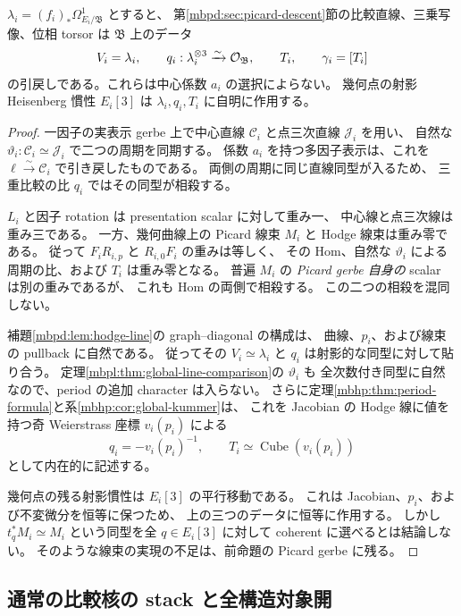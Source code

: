 \begin{lemma}[周期データの射影的自然性]
\label{mbic:lem:phase-descent}
$\lambda_i=(f_i)_*\Omega^1_{E_i/\mathfrak B}$ とすると、
第\ref{mbpd:sec:picard-descent}節の比較直線、三乗写像、位相 torsor は
$\mathfrak B$ 上のデータ
\[
 V_i=\lambda_i,\qquad q_i:\lambda_i^{\otimes3}\xrightarrow{\sim}\mathcal O_{\mathfrak B},
 \qquad T_i,\qquad \gamma_i=[T_i]
\]
の引戻しである。これらは中心係数 $a_i$ の選択によらない。
幾何点の射影 Heisenberg 慣性 $E_i[3]$ は $\lambda_i,q_i,T_i$ に自明に作用する。
\end{lemma}
\begin{proof}
一因子の実表示 gerbe 上で中心直線 $\mathcal C_i$ と点三次直線 $\mathcal J_i$ を用い、
自然な $\vartheta_i:\mathcal C_i\simeq\mathcal J_i$ で二つの周期を同期する。
係数 $a_i$ を持つ多因子表示は、これを
$\ell\xrightarrow{\sim}\mathcal C_i$ で引き戻したものである。
両側の周期に同じ直線同型が入るため、
三重比較の比 $q_i$ ではその同型が相殺する。

$L_i$ と因子 rotation は presentation scalar に対して重み一、
中心線と点三次線は重み三である。
一方、幾何曲線上の Picard 線束 $M_i$ と Hodge 線束は重み零である。
従って $F_iR_{i,p}$ と $R_{i,0}F_i$ の重みは等しく、
その Hom、自然な $\vartheta_i$ による周期の比、および $T_i$ は重み零となる。
普遍 $M_i$ の \emph{Picard gerbe 自身の} scalar は別の重みであるが、
これも Hom の両側で相殺する。
この二つの相殺を混同しない。

補題\ref{mbpd:lem:hodge-line}の graph--diagonal の構成は、
曲線、$p_i$、および線束の pullback に自然である。
従ってその $V_i\simeq\lambda_i$ と $q_i$ は射影的な同型に対して貼り合う。
定理\ref{mbpl:thm:global-line-comparison}の $\vartheta_i$ も
全次数付き同型に自然なので、period の追加 character は入らない。
さらに定理\ref{mbhp:thm:period-formula}と系\ref{mbhp:cor:global-kummer}は、
これを Jacobian の Hodge 線に値を持つ奇 Weierstrass 座標 $v_i(p_i)$ による
\[
 q_i=-v_i(p_i)^{-1},\qquad
 T_i\simeq\operatorname{Cube}(v_i(p_i))
\]
として内在的に記述する。

幾何点の残る射影慣性は $E_i[3]$ の平行移動である。
これは Jacobian、$p_i$、および不変微分を恒等に保つため、
上の三つのデータに恒等に作用する。
しかし $t_q^*M_i\simeq M_i$ という同型を全 $q\in E_i[3]$ に対して
coherent に選べるとは結論しない。
そのような線束の実現の不足は、前命題の Picard gerbe に残る。
\end{proof}

\subsection{通常の比較核の stack と全構造対象開}

